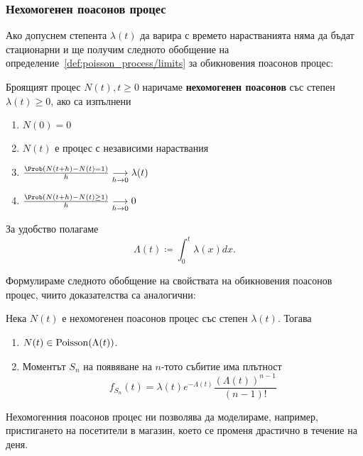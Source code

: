 \documentclass[numbers=endperiod, bibliography=totocnumbered]{scrartcl}
\begin{document}
\subsubsection{Нехомогенен поасонов процес}

Ако допуснем степента \( \lambda(t) \) да варира с времето нарастванията няма да бъдат стационарни и ще получим следното обобщение на определение~\ref{def:poisson_process/limits} за обикновения поасонов процес:
\begin{definition}
  Броящият процес \( N(t), t \geq 0 \) наричаме \textbf{нехомогенен поасонов} със степен \( \lambda(t) \geq 0 \), ако са изпълнени
  \begin{enumerate}
    \item \( N(0) = 0 \)
    \item \( N(t) \) е процес с независими нараствания
    \item \( \frac {\Prob(N(t+h) - N(t) = 1)} h \Conv[h \to 0]{} \lambda(t) \)
    \item \( \frac {\Prob(N(t+h) - N(t) \geq 1)} h \Conv[h \to 0]{} 0 \)
  \end{enumerate}

  За удобство полагаме
  \begin{equation*}
    \Lambda(t) \coloneqq \int_0^t \lambda(x) dx.
  \end{equation*}
\end{definition}

Формулираме следното обобщение на свойствата на обикновения поасонов процес, чиито доказателства са аналогични:
\begin{theorem}
  Нека \( N(t) \) е нехомогенен поасонов процес със степен \( \lambda(t) \). Тогава
  \begin{enumerate}
    \item \( N(t) \in \operatorname{Poisson}(\Lambda(t)) \).
    \item Моментът \( S_n \) на появяване на \( n \)-тото събитие има плътност
    \begin{equation*}
      f_{S_n}(t) = \lambda(t) e^{-\Lambda(t)} \frac {{(\Lambda(t))}^{n-1}} {(n-1)!}
    \end{equation*}
  \end{enumerate}
\end{theorem}

\begin{remark}
  Нехомогенния поасонов процес ни позволява да моделираме, например, пристигането на посетители в магазин, което се променя драстично в течение на деня.
\end{remark}

\printbibliography
\end{document}
